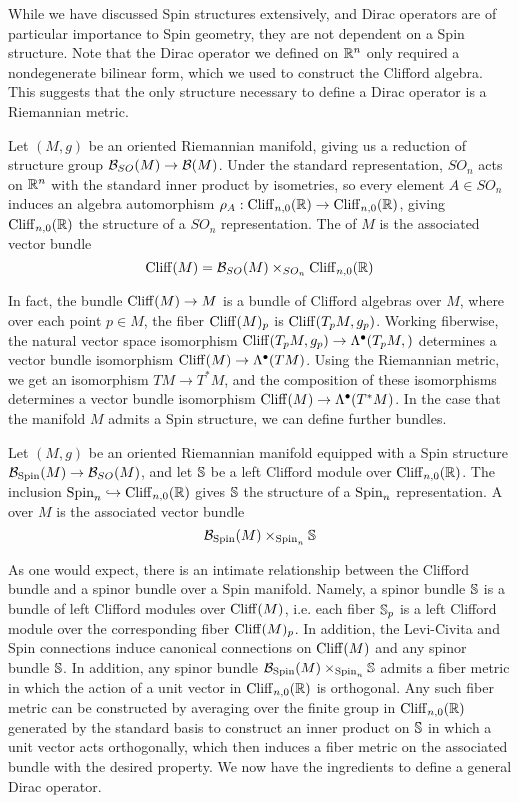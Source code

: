 While we have discussed Spin structures extensively, and Dirac operators are
of particular importance to Spin geometry, they are not dependent on a Spin structure.
Note that the Dirac operator we defined on $\R^n$ only required a nondegenerate
bilinear form, which we used to construct the Clifford algebra. This suggests
that the only structure necessary to define a Dirac operator is a Riemannian metric.
%
\begin{defn}
Let $(M,g)$ be an oriented Riemannian manifold, giving us a reduction of structure
group $\B_{SO}(M) \to \B(M)$. Under the standard representation, $SO_n$ acts on $\R^n$
with the standard inner product by isometries, so every element $A \in SO_n$ induces
an algebra automorphism  $\rho_A : \Cliff_{n,0}(\R) \to \Cliff_{n,0}(\R)$, giving
$\Cliff_{n,0}(\R)$ the structure of a $SO_n$ representation. The 
of $M$ is the associated vector bundle
\[
\Cliff(M) = \B_{SO}(M) \times_{SO_n} \Cliff_{n,0}(\R)
\]
\end{defn}
%
In fact, the bundle $\Cliff(M) \to M$ is a bundle of Clifford algebras over $M$, where
over each point $p \in M$, the fiber $\Cliff(M)_p$ is $\Cliff(T_pM, g_p)$. Working
fiberwise, the natural vector space isomorphism
$\Cliff(T_pM, g_p) \to \Lambda^\bullet(T_pM,)$ determines  a vector bundle isomorphism
$\Cliff(M) \to \Lambda^\bullet(TM)$. Using the Riemannian metric, we get an isomorphism
$TM \to T^*M$, and the composition of these isomorphisms determines a vector bundle
isomorphism $\Cliff(M) \to \Lambda^\bullet(T^*M)$. In the case that the manifold
$M$ admits a Spin structure, we can define further bundles.
%
\begin{defn}
Let $(M,g)$ be an oriented Riemannian manifold equipped with a Spin structure
$\B_{\Spin}(M) \to \B_{SO}(M)$, and let $\S$ be a left Clifford module over
$\Cliff_{n,0}(\R)$. The inclusion $\Spin_n \hookrightarrow \Cliff_{n,0}(\R)$ gives $\S$
the structure of a $\Spin_n$ representation. A  over $M$ is the
associated vector bundle
\[
\B_\Spin(M) \times_{\Spin_n} \S
\]
\end{defn}
%
As one would expect, there is an intimate relationship between the Clifford bundle
and a spinor bundle over a Spin manifold. Namely, a spinor bundle $\S$ is a
bundle of left Clifford modules over $\Cliff(M)$, i.e. each fiber $\S_p$ is a left
Clifford module over the corresponding fiber $\Cliff(M)_p$. In addition, the
Levi-Civita and Spin connections induce canonical connections on $\Cliff(M)$ and
any spinor bundle $\S$. In addition, any spinor bundle
$\B_{\Spin}(M) \times_{\Spin_n}\S$ admits a fiber metric
in which the action of a unit vector in $\Cliff_{n,0}(\R)$ is orthogonal. Any such
fiber metric  can be constructed by averaging over the finite group in
$\Cliff_{n,0}(\R)$ generated by the standard basis to construct an inner product on
$\S$ in which a unit vector acts orthogonally, which then induces a fiber metric on
the associated bundle with the desired property. We now have the ingredients to define
a general Dirac operator. \\
%

